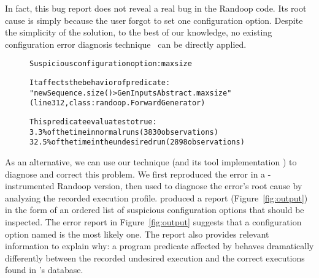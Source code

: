 
In fact, this bug report does not reveal a real bug
in the Randoop code. Its root cause is simply because
the user forgot to set one configuration option.
Despite the simplicity of the solution, to the best of our knowledge, no
existing configuration error diagnosis technique~\cite{Attariyan:2008:UCD, 
Whitaker:2004:CDS, Wang:2004:AMT,
Attariyan:2010:ACT, Rabkin:2011:PPC} can be directly applied.




\begin{figure}[t]
\begin{CodeOut}
\begin{alltt} 
Suspicious configuration option: maxsize

It affects the behavior of predicate:
"newSequence.size() > GenInputsAbstract.maxsize"
(line 312, class: randoop.ForwardGenerator) 

This predicate evaluates to true:
  3.3\% of the time in normal runs (3830 observations)
  32.5\% of the time in the undesired run (2898 observations)
\end{alltt}
\end{CodeOut}
\vspace*{-13pt}
\end{figure}

As an alternative, we can use our technique (and its tool implementation \ourtool)
to diagnose and correct this problem. We first reproduced the
error in a \ourtool-instrumented Randoop version, then used \ourtool
to diagnose the error's root cause by analyzing the recorded execution profile.
\ourtool produced
a report (Figure~\ref{fig:output}) in the form of an ordered list of
suspicious configuration options that should be inspected.
The error report in Figure~\ref{fig:output} suggests that
a configuration option named
 is the most likely one.
The report also provides relevant 
information to explain why: %
a program predicate affected by  behaves dramatically
differently between the recorded undesired execution
and the correct executions found in \ourtool's database.


